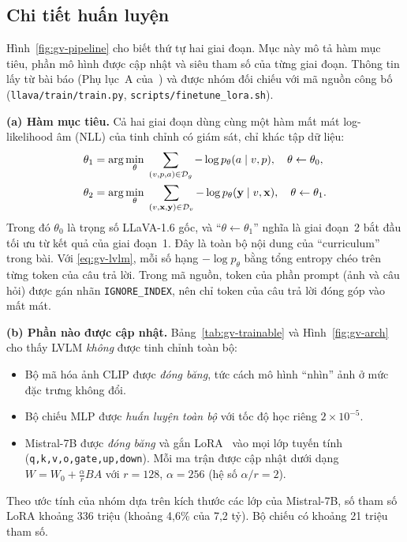 \subsection{Chi tiết huấn luyện}\label{sec:gv-training}
Hình~\ref{fig:gv-pipeline} cho biết thứ tự hai giai đoạn. Mục này mô tả hàm mục tiêu, phần mô hình được cập nhật và siêu tham số của từng giai đoạn. Thông tin lấy từ bài báo (Phụ lục~A của~\cite{deng2024graphvis}) và được nhóm đối chiếu với mã nguồn công bố (\texttt{llava/train/train.py}, \texttt{scripts/finetune\_lora.sh}).

\textbf{(a) Hàm mục tiêu.} Cả hai giai đoạn dùng cùng một hàm mất mát log-likelihood âm (NLL) của tinh chỉnh có giám sát, chỉ khác tập dữ liệu:
\begin{align}
\theta_1&=\arg\min_{\theta}\;\sum_{(v,p,a)\in\mathcal{D}_g}-\log p_\theta(a\mid v,p),\quad \theta\leftarrow\theta_0,\label{eq:gv-loss}\\
\theta_2&=\arg\min_{\theta}\;\sum_{(v,\mathbf{x},\mathbf{y})\in\mathcal{D}_v}-\log p_\theta(\mathbf{y}\mid v,\mathbf{x}),\quad \theta\leftarrow\theta_1.
\end{align}
Trong đó $\theta_0$ là trọng số LLaVA-1.6 gốc, và ``$\theta\leftarrow\theta_1$'' nghĩa là giai đoạn~2 bắt đầu tối ưu từ kết quả của giai đoạn~1. Đây là toàn bộ nội dung của ``curriculum'' trong bài. Với \eqref{eq:gv-lvlm}, mỗi số hạng $-\log p_\theta$ bằng tổng entropy chéo trên từng token của câu trả lời. Trong mã nguồn, token của phần prompt (ảnh và câu hỏi) được gán nhãn \texttt{IGNORE\_INDEX}, nên chỉ token của câu trả lời đóng góp vào mất mát.

\textbf{(b) Phần nào được cập nhật.} Bảng~\ref{tab:gv-trainable} và Hình~\ref{fig:gv-arch} cho thấy LVLM \emph{không} được tinh chỉnh toàn bộ:
\begin{itemize}
\item Bộ mã hóa ảnh CLIP được \emph{đóng băng}, tức cách mô hình ``nhìn'' ảnh ở mức đặc trưng không đổi.
\item Bộ chiếu MLP được \emph{huấn luyện toàn bộ} với tốc độ học riêng $2\times10^{-5}$.
\item Mistral-7B được \emph{đóng băng} và gắn LoRA~\cite{hu2022lora} vào mọi lớp tuyến tính (\texttt{q,k,v,o,gate,up,down}). Mỗi ma trận được cập nhật dưới dạng $W=W_0+\frac{\alpha}{r}BA$ với $r=128$, $\alpha=256$ (hệ số $\alpha/r=2$).
\end{itemize}
Theo ước tính của nhóm dựa trên kích thước các lớp của Mistral-7B, số tham số LoRA khoảng 336 triệu (khoảng 4,6\% của 7,2 tỷ). Bộ chiếu có khoảng 21 triệu tham số.

